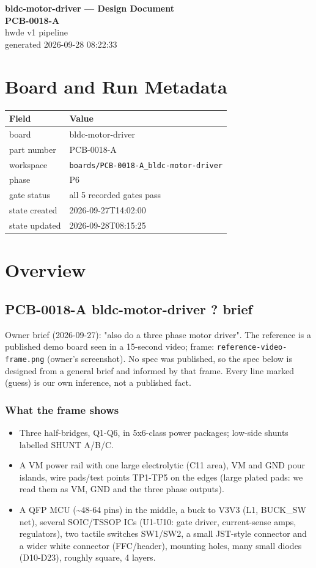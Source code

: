 \documentclass[11pt,a4paper]{article}
\begin{document}
\sloppy
\begin{center}
{\LARGE\bfseries bldc-motor-driver --- Design Document}\\[6pt]
{\Large\bfseries PCB-0018-A}\\[6pt]
{\large hwde v1 pipeline}\\[2pt]
generated 2026-09-28 08:22:33
\end{center}
\tableofcontents

\section{Board and Run Metadata}
{\small
\begin{longtable}{lp{11cm}}
\toprule
\textbf{Field} & \textbf{Value} \\
\midrule
\endhead
board & bldc-motor-driver \\
part number & PCB-0018-A \\
workspace & \texttt{boards/PCB-0018-A\_bldc-motor-driver} \\
phase & P6 \\
gate status & all 5 recorded gates pass \\
state created & 2026-09-27T14:02:00 \\
state updated & 2026-09-28T08:15:25 \\
\bottomrule
\end{longtable}
}
\section{Overview}
\subsection*{PCB-0018-A bldc-motor-driver ? brief}
Owner brief (2026-09-27): "also do a three phase motor driver". The reference is a published demo board seen in a 15-second video; frame: \texttt{reference-video-frame.png} (owner's screenshot). No spec was published, so the spec below is designed from a general brief and informed by that frame. Every line marked (guess) is our own inference, not a published fact.

\subsubsection*{What the frame shows}
\begin{itemize}
\item Three half-bridges, Q1-Q6, in 5x6-class power packages; low-side shunts labelled SHUNT A/B/C.
\item A VM power rail with one large electrolytic (C11 area), VM and GND pour islands, wire pads/test points TP1-TP5
on the edges (large plated pads: we read them as VM, GND and the three phase outputs).
\item A QFP MCU (\textasciitilde{}48-64 pins) in the middle, a buck to V3V3 (L1, BUCK\_SW net), several SOIC/TSSOP ICs (U1-U10:
gate driver, current-sense amps, regulators), two tactile switches SW1/SW2, a small JST-style connector and a
wider white connector (FFC/header), mounting holes, many small diodes (D10-D23), roughly square, 4 layers.
\end{itemize}
\end{document}
